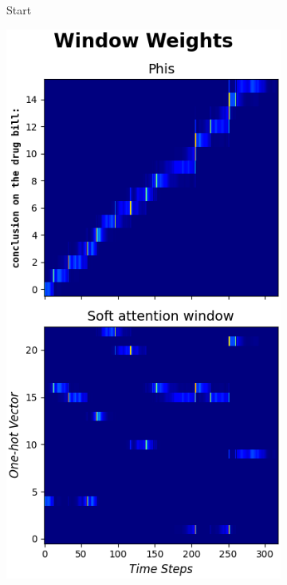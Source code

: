 \documentclass{article}
\begin{document}
\begin{figure}[hbt!]
\begin{subfigure}[b]{0.24\textwidth}
         \caption{Start}
         \label{fig:weight_heatmaps:a}
     \end{subfigure}
     \hfill
     \begin{subfigure}[b]{0.24\textwidth}
         \centering
         \includegraphics[width=\textwidth]{heatmap_weights_100}

\end{subfigure}
\end{figure}
\end{document}

